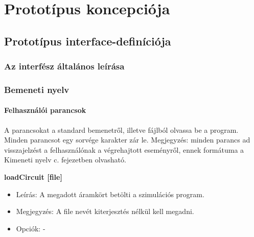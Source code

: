 %
\chapter{Prototípus koncepciója}

\parindent 0pt
\setcounter{secnumdepth}{3}
\setcounter{tocdepth}{3}
\thispagestyle{fancy}

\section{Prototípus interface-definíciója}

\subsection{Az interfész általános leírása}

\subsection{Bemeneti nyelv}

\subsubsection{Felhasználói parancsok}

A parancsokat a standard bemenetről, illetve fájlból olvassa be a program. Minden parancsot egy sorvége karakter zár le.\newline
Megjegyzés: minden parancs ad visszajelzést a felhasználónak a végrehajtott eseményről, ennek formátuma a Kimeneti nyelv c. fejezetben olvasható.\newline

\textbf{loadCircuit [file]}
\begin{itemize}
	\item Leírás: A megadott áramkört betölti a szimulációs program.
	\item Megjegyzés: A file nevét kiterjesztés nélkül kell megadni.
	\item Opciók: -
\end{itemize}

